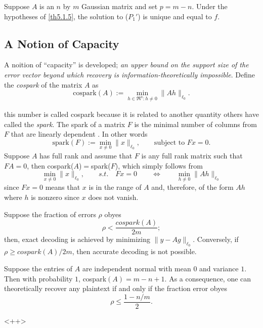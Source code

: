 \begin{corollary}
    \label{cr5.1.6}
    Suppose $A$ is an $n$ by $m$ Gaussian matrix and set $p = m-n$. Under the hypotheses of \cref{th5.1.5}, the solution to ($P_1'$) is unique and equal to $f$.
\end{corollary}

\subsection{A Notion of Capacity}
A noition of ``capacity'' is developed; \emph{\textcolor[rgb]{1,0,0}{an upper bound on the support size of the error vector beyond which recovery is information-theoretically impossible}}. Define the \emph{cospark} of the matrix $A$ as 
\begin{equation}
    \text{cospark}(A) := \min\limits_{h \in \mathfrak{R}^n : h \neq 0} \|Ah\|_{\ell_0}.
    \label{eq5.1.11}
\end{equation}

this number is called cospark because it is related to another quantity others have called the \emph{spark}. The spark of a matrix $F$ is the minimal number of columns from $F$ that are linearly dependent \cite{2-33,2-27}. In other words
\begin{equation*}
    \text{spark}(F) := \min\limits_{x \neq 0}\|x\|_{\ell_0}, \qquad \text{subject to } Fx=0.
\end{equation*}
Suppose $A$ has full rank and assume that $F$ is any full rank matrix such that $FA=0$, then cospark($A$)$=$spark($F$), which simply follows from
\begin{equation*}
    \min\limits_{x \neq 0} \|x\|_{\ell_0}, \qquad s.t. \quad Fx=0 \qquad \Leftrightarrow \qquad \min\limits_{h \neq 0} \|Ah\|_{\ell_0}
\end{equation*}
since $Fx=0$ means that $x$ is in the range of $A$ and, therefore, of the form $Ah$ where $h$ is nonzero since $x$ does not vanish.


\begin{lemma}
    Suppose the fraction of errors $\rho$ obyes
    \begin{equation}
        \rho < \dfrac{cospark(A)}{2m};
        \label{eq5.1.12}
    \end{equation}
    then, exact decoding is achieved by minimizing $\|y-Ag\|_{\ell_0}$. Conversely, if $\rho \geq cospark(A)/2m$, then accurate decoding is not possible.
    \label{lm5.1.7}
\end{lemma}


\begin{corollary}
    \label{cr5.1.8}
    Suppose the entries of $A$ are independent normal with mean $0$ and variance $1$. Then with probability $1$, cospark$(A)=m-n+1$. As a consequence, one can theoretically recover any plaintext if and only if the fraction error obyes
    \begin{equation}
        \rho \leq \dfrac{1-n/m}{2}.
        \label{eq5.1.13}
    \end{equation}
\end{corollary}<++>





\label{eq5.3.23}






